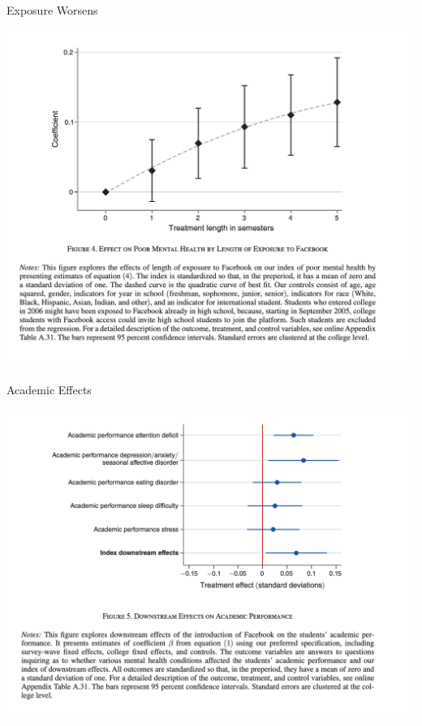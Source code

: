 \documentclass{beamer}
\begin{document}
\begin{frame}{Exposure Worsens}
\begin{center}
\includegraphics[scale=0.35]{./lecture_includes/facebook_5}
\end{center}
\end{frame}

\begin{frame}{Academic Effects}
\begin{center}
\includegraphics[scale=0.35]{./lecture_includes/facebook_6}
\end{center}
\end{frame}
\end{document}
